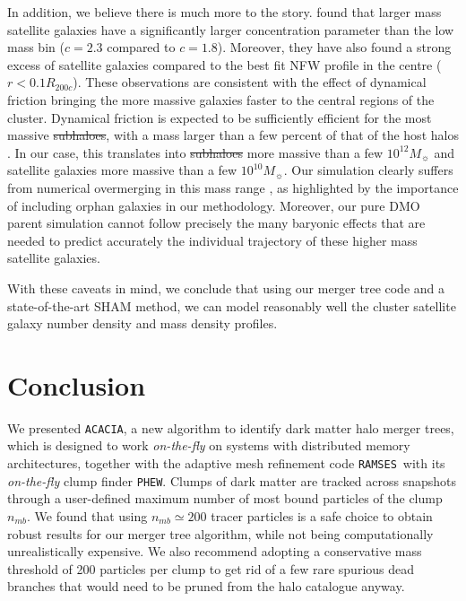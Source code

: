 \documentclass[a4paper,twocolumn,fleqn,usenatbib]{mnras}
\newcommand{\ramses}{\texttt{RAMSES}}
\newcommand{\phew}{\texttt{PHEW}}
\newcommand{\msol}{M_{\sun}}
\providecommand{\DIFadd}[1]{{\protect\color{blue}\uwave{#1}}} %
\providecommand{\DIFdel}[1]{{\protect\color{red}\sout{#1}}}                      %
\providecommand{\DIFaddbegin}{} %
\providecommand{\DIFaddend}{} %
\providecommand{\DIFdelbegin}{} %
\providecommand{\DIFdelend}{} %
\newcommand{\DIFscaledelfig}{0.5}
\newlength{\DIFdelgraphicswidth} %
\newlength{\DIFdelgraphicsheight} %
\newcommand{\DIFaddincludegraphics}[2][]{{\color{blue}\fbox{\DIFOincludegraphics[#1]{#2}}}} %
\newcommand{\DIFdelincludegraphics}[2][]{%
\sbox{\DIFdelgraphicsbox}{\DIFOincludegraphics[#1]{#2}}%
\settoboxwidth{\DIFdelgraphicswidth}{\DIFdelgraphicsbox} %
\settoboxtotalheight{\DIFdelgraphicsheight}{\DIFdelgraphicsbox} %
\scalebox{\DIFscaledelfig}{%
\parbox[b]{\DIFdelgraphicswidth}{\usebox{\DIFdelgraphicsbox}\\[-\baselineskip] \rule{\DIFdelgraphicswidth}{0em}}\llap{\resizebox{\DIFdelgraphicswidth}{\DIFdelgraphicsheight}{%
\setlength{\unitlength}{\DIFdelgraphicswidth}%
\begin{picture}(1,1)%
\thicklines\linethickness{2pt} %
{\color[rgb]{1,0,0}\put(0,0){\framebox(1,1){}}}%
{\color[rgb]{1,0,0}\put(0,0){\line( 1,1){1}}}%
{\color[rgb]{1,0,0}\put(0,1){\line(1,-1){1}}}%
\end{picture}%
}\hspace*{3pt}}} %
} %
\DeclareRobustCommand{\DIFaddbegin}{\DIFOaddbegin \let\includegraphics\DIFaddincludegraphics} %
\DeclareRobustCommand{\DIFaddend}{\DIFOaddend \let\includegraphics\DIFOincludegraphics} %
\DeclareRobustCommand{\DIFdelbegin}{\DIFOdelbegin \let\includegraphics\DIFdelincludegraphics} %
\DeclareRobustCommand{\DIFdelend}{\DIFOaddend \let\includegraphics\DIFOincludegraphics} %
\begin{document}
In   addition,    we   believe   there    is   much   more    to   the
story. \citet{vanderburgEvidenceInsideoutGrowth2015} found that larger
mass  satellite galaxies  have  a  significantly larger  concentration
parameter   than    the   low   mass   bin    ($c=2.3$   compared   to
$c=1.8$). Moreover, they have also  found a strong excess of satellite
galaxies compared to the best fit NFW  profile in the centre ($r < 0.1
R_{200c}$).   These observations  are  consistent with  the effect  of
dynamical friction  bringing the more  massive galaxies faster  to the
central regions of  the cluster. Dynamical friction is  expected to be
sufficiently efficient  for the  most massive  \DIFdelbegin \DIFdel{subhaloes}\DIFdelend \DIFaddbegin \DIFadd{sub-haloes}\DIFaddend , with  a mass
larger than a few  percent of that of the host  halos 
\citep[e.g.][]{binneyGalacticDynamicsSecond2008,Mo}. 
In our case, this  translates into
\DIFdelbegin \DIFdel{subhaloes  }\DIFdelend \DIFaddbegin \DIFadd{sub-haloes  }\DIFaddend more  massive  than  a  few  $10^{12}\msol$  and  satellite
galaxies  more  massive than  a  few  $10^{10}\msol$.  Our  simulation
clearly suffers from  numerical overmerging in this  mass range 
\citep{vandenboschDisruptionDarkMatter2018}, as highlighted  by the 
importance of including  orphan galaxies in
our  methodology.  Moreover,  our  pure DMO  parent simulation  cannot
follow precisely the many baryonic  effects that are needed to predict
accurately the  individual trajectory  of these higher  mass satellite
galaxies.

With these  caveats in mind,  we conclude  that using our  merger tree
code and a  state-of-the-art SHAM method, we can  model reasonably well
the cluster satellite galaxy number density and mass density profiles.

\section{Conclusion}\label{chap:conclusion}


We presented \texttt{ACACIA}, a new  algorithm to identify dark matter
halo  merger trees,  which is  designed  to work  {\it on-the-fly}  on
systems  with  distributed  memory architectures,  together  with  the
adaptive mesh refinement code \ramses\ with its {\it on-the-fly} clump
finder  \phew.  Clumps  of dark  matter are  tracked across  snapshots
through a user-defined  maximum number of most bound  particles of the
clump  $n_{mb}$.   We found  that  using  $n_{mb} \simeq  200$  tracer
particles is  a safe choice  to obtain  robust results for  our merger
tree  algorithm,  while   not  being  computationally  unrealistically
expensive.  We  also recommend adopting a  conservative mass threshold
of 200  particles per  clump to get  rid of a  few rare  spurious dead
branches that would need to be pruned from the halo catalogue anyway.
\end{document}
